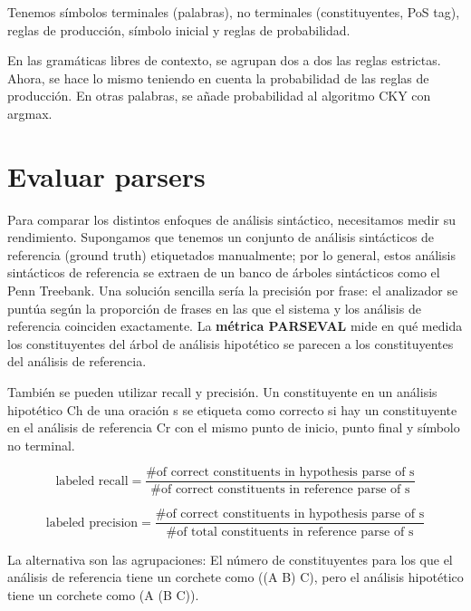 Tenemos símbolos terminales (palabras), no terminales (constituyentes, PoS tag), reglas de producción, símbolo inicial y reglas de probabilidad. 

En las gramáticas libres de contexto, se agrupan dos a dos las reglas estrictas. Ahora, se hace lo mismo teniendo en cuenta la probabilidad de las reglas de producción. En otras palabras, se añade probabilidad al algoritmo CKY con argmax. 

\section{Evaluar parsers}
Para comparar los distintos enfoques de análisis sintáctico, necesitamos medir su rendimiento. Supongamos que tenemos un conjunto de análisis sintácticos de referencia (ground truth) etiquetados manualmente; por lo general, estos análisis sintácticos de referencia se extraen de un banco de árboles sintácticos como el Penn Treebank. Una solución sencilla sería la precisión por frase: el analizador se puntúa según la proporción de frases en las que el sistema y los análisis de referencia coinciden exactamente. La \textbf{métrica PARSEVAL} mide en qué medida los constituyentes del árbol de análisis hipotético se parecen a los constituyentes del análisis de referencia.

También se pueden utilizar recall y precisión. Un constituyente en un análisis hipotético Ch de una oración s se etiqueta como correcto si hay un constituyente en el análisis de referencia Cr con el mismo punto de inicio, punto final y símbolo no terminal. 

$$\text{labeled recall} = \frac{\text{\# of correct constituents in hypothesis parse of s}}{\text{\# of correct constituents in reference parse of s}}$$

$$\text{labeled precision} = \frac{\text{\# of correct constituents in hypothesis parse of s}}{\text{\# of total constituents in reference parse of s}}$$

La alternativa son las agrupaciones: El número de constituyentes para los que el análisis de referencia tiene un corchete como ((A B) C), pero el análisis hipotético tiene un corchete como (A (B C)).